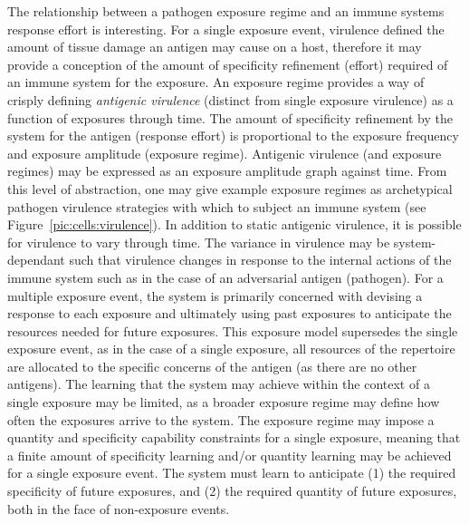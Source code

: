 The relationship between a pathogen exposure regime and an immune systems response effort is interesting. For a single exposure event, virulence defined the amount of tissue damage an antigen may cause on a host, therefore it may provide a conception of the amount of specificity refinement (effort) required of an immune system for the exposure. An exposure regime provides a way of crisply defining \emph{antigenic virulence} (distinct from single exposure virulence) as a function of exposures through time. The amount of specificity refinement by the system for the antigen (response effort) is proportional to the exposure frequency and exposure amplitude (exposure regime). Antigenic virulence (and exposure regimes) may be expressed as an exposure amplitude graph against time. From this level of abstraction, one may give example exposure regimes as archetypical pathogen virulence strategies with which to subject an immune system (see Figure~\ref{pic:cells:virulence}). In addition to static antigenic virulence, it is possible for virulence to vary through time. The variance in virulence may be system-dependant such that virulence changes in response to the internal actions of the immune system such as in the case of an adversarial antigen (pathogen). 
For a multiple exposure event, the system is primarily concerned with devising a response to each exposure and ultimately using past exposures to anticipate the resources needed for future exposures. This exposure model supersedes the single exposure event, as in the case of a single exposure, all resources of the repertoire are allocated to the specific concerns of the antigen (as there are no other antigens). The learning that the system may achieve within the context of a single exposure may be limited, as a broader exposure regime may define how often the exposures arrive to the system. The exposure regime may impose a quantity and specificity capability constraints for a single exposure, meaning that a finite amount of specificity learning and/or quantity learning may be achieved for a single exposure event. The system must learn to anticipate (1) the required specificity of future exposures, and (2) the required quantity of future exposures, both in the face of non-exposure events. 

